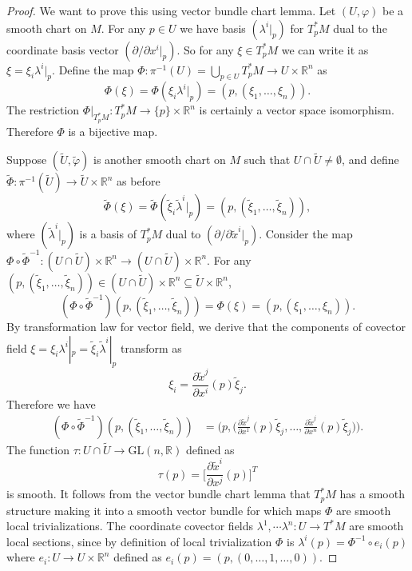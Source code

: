 \documentclass[a4paper]{article}
\theoremstyle{remark}
\newcommand{\er}{\mathbb{R}} %
\newcommand{\rn}{\mathbb{R}^n} %
\newcommand{\doo}{\partial}    %
\newcommand{\subhim}{\subseteq} %
\newcommand{\GL}{\text{GL}(n,\er)} %
\newcommand{\tpstarm}{T^*_pM} %
\newcommand\wtilde[1]{\widetilde{#1}} %
\begin{document}
\begin{proof}
We want to prove this using vector bundle chart lemma. Let $(U,\varphi)$ be a smooth chart on $M$. For any $p \in U$ we have basis $(\lambda^i|_p)$ for $T^*_pM$ dual to the coordinate basis vector  $(\doo / \doo x^i|_p )$. So for any $\xi \in T^*_pM$ we can write it as $\xi = \xi_i \lambda^i|_p$. Define the map $ \Phi : \pi^{-1}(U) = \bigcup_{p \in U} T^*_pM \to U \times \rn$ as
$$
\Phi (\xi) = \Phi (\xi_i \lambda^i|_p) = (p, (\xi_1,\dots,\xi_n) ).
$$ 
The restriction $\Phi|_{\tpstarm} : \tpstarm \to \{p\} \times \rn$ is certainly a vector space isomorphism. Therefore $\Phi$ is a bijective map. 

Suppose $(\widetilde{U},\wtilde{\varphi})$ is another smooth chart on $M$ such that $U \cap \wtilde{U} \neq \emptyset$, and define $\wtilde{\Phi} : \pi^{-1}(\wtilde{U}) \to \wtilde{U} \times \rn$ as before
$$
\wtilde{\Phi} (\xi) = \wtilde{\Phi} (\tilde{\xi}_i \wtilde{\lambda}^i|_p) = (p, (\tilde{\xi}_1,\dots,\tilde{\xi}_n)),
$$
where $(\wtilde{\lambda}^i|_p)$ is a basis of $\tpstarm$ dual to $(\doo / \doo \wtilde{x}^i|_p )$. Consider the map $\Phi \circ \wtilde{\Phi}^{-1} : (U \cap \wtilde{U}) \times \rn \to (U \cap \wtilde{U}) \times \rn$. For any $(p,(\tilde{\xi}_1,\dots,\tilde{\xi}_n) ) \in (U \cap \wtilde{U}) \times \rn \subhim \wtilde{U} \times \rn$,
$$
(\Phi \circ \wtilde{\Phi}^{-1}) (p,(\tilde{\xi}_1,\dots,\tilde{\xi}_n)) = \Phi(\xi) = (p,(\xi_1,\dots,\xi_n)).
$$
By transformation law for vector field, we derive that the components of covector field $\xi=\xi_i \lambda^i|_p = \tilde{\xi}_i \wtilde{\lambda}^i|_p$ transform as 
$$
\xi_i = \frac{\doo \wtilde{x}^j}{\doo x^i}(p) \tilde{\xi}_j.
$$
Therefore we have 
\begin{align*}
(\Phi \circ \wtilde{\Phi}^{-1}) (p,(\tilde{\xi}_1,\dots,\tilde{\xi}_n)) &= \bigg(p, \bigg( \frac{\doo \wtilde{x}^j}{\doo x^1}(p) \tilde{\xi}_j,\dots, \frac{\doo \wtilde{x}^j}{\doo x^n}(p) \tilde{\xi}_j  \bigg)\bigg).
\end{align*}
The function $\tau : U \cap \wtilde{U} \to \GL$ defined as 
$$
\tau(p) = \bigg[ \frac{\doo \wtilde{x}^i}{\doo x^j}(p) \bigg]^T
$$
is smooth. It follows from the vector bundle chart lemma that $\tpstarm$ has a smooth structure making it into a smooth vector bundle for which maps $\Phi$ are smooth local trivializations. The coordinate covector fields $\lambda^1 ,\dotsm\lambda^n : U \to T^*M$ are smooth local sections, since by definition of local trivialization $\Phi$ is $\lambda^i (p)  = \Phi^{-1} \circ e_i (p)$ where $e_i : U \to U \times \rn$ defined as $e_i (p) = (p, (0,\dots,1,\dots,0) )$. 
\end{proof}
\end{document}
